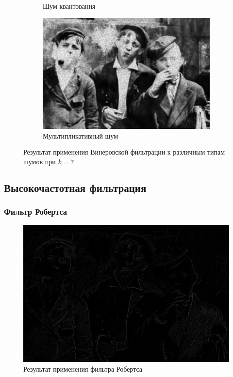\begin{figure}[ht!]
\begin{subfigure}[b]{0.5\linewidth}
      \caption{Шум квантования} 
      \label{weiner_7:e}
    \end{subfigure}%
    \begin{subfigure}[b]{0.5\linewidth}
        \centering
        \includegraphics[width=0.95\linewidth]{../Wiener_Filter/Wiener_Speckle_noise_(k=7).jpg} 
        \caption{Мультипликативный шум} 
        \label{weiner_7:f} 
    \end{subfigure} 
    \caption{Результат применения Винеровской фильтрации к различным типам шумов при $k = 7$}
    \label{img:weiner_7} 
\end{figure}
\FloatBarrier


\subsection{Высокочастотная фильтрация}
\subsubsection{Фильтр Робертса}

\begin{figure}[ht!]
  \centering
  \includegraphics[width=\textwidth]{../Edge_Detection/Robertson_Smoking_boys.jpg}
  \caption{Результат применения фильтра Робертса}
  \label{img:roberts}  
\end{figure}
\FloatBarrier

